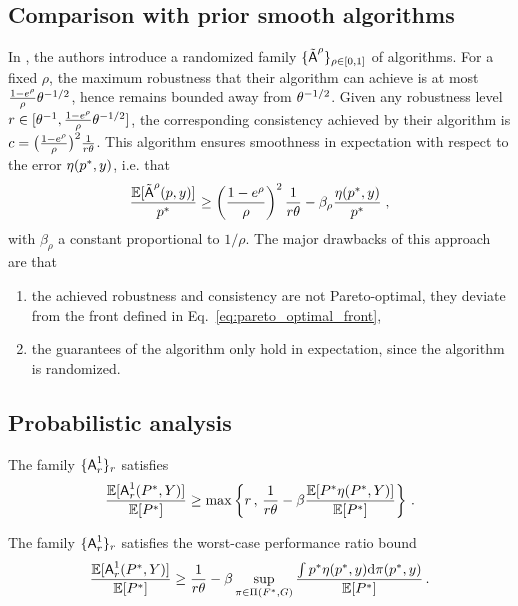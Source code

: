 \subsection{Comparison with prior smooth algorithms}\label{appx:comparison-with-prior-smooth} 
In \citep{benomar2025tradeoffs}, the authors introduce a randomized family $\{\tilde{\mbox{\textup{\textsf{A}}}}^\rho\}_{\rho \in [0,1]}$ of algorithms. For a fixed $\rho$, the maximum robustness that their algorithm can achieve is at most $\frac{1-e^\rho}{\rho} \theta^{-1/2}$, hence remains bounded away from $\theta^{-1/2}$. Given any robustness level $r \in [\theta^{-1}, \frac{1-e^\rho}{\rho} \theta^{-1/2}]$, the corresponding consistency achieved by their algorithm is  $c = \big( \frac{1-e^\rho}{\rho} \big)^2 \frac{1}{r \theta}$.
This algorithm ensures smoothness in expectation with respect to the error $\eta(p^*,y)$, i.e. that 
\[
\frac{\mathbb{E}[\tilde{\mbox{\textup{\textsf{A}}}}^\rho(p, y)]}{p^*} 
\geq \left( \frac{1-e^\rho}{\rho} \right)^2 \frac{1}{r \theta} - \beta_\rho \frac{\eta(p^*, y)}{p^*}\;,
\]
with $\beta_\rho$ a constant proportional to $1/\rho$. The major drawbacks of this approach are that
\begin{enumerate}
    \item the achieved robustness and consistency are not Pareto-optimal, \ie they deviate from the front defined in Eq.~\eqref{eq:pareto_optimal_front},
    \item the guarantees of the algorithm only hold in expectation, since the algorithm is randomized.
\end{enumerate}


\subsection{Probabilistic analysis}\label{subapp: proba additive analysis}

\begin{corollary}\label{cor: [Stochastic bounds] additive smoothness}
    The family $\{\mbox{\textup{\textsf{A}}}^1_r\}_{r}$ satisfies
    \begin{align}
        \frac{\mathbb{E}[\mbox{\textup{\textsf{A}}}^1_r(P^*,Y)]}{\mathbb{E}[P^*]}\ge \max\left\{r\,,\,\frac{1}{r\theta}-\beta\frac{\mathbb{E}[P^*\eta(P^*,Y)]}{\mathbb{E}[P^*]}\right\}\,.\label{eq: [Stochastic bounds/ THM additive smoothness] PR bound}
    \end{align}
\end{corollary}



\begin{corollary}\label{cor: [Stochastic bounds] additive smoothness OT bound}
    The family $\{\mbox{\textup{\textsf{A}}}^1_r\}_{r}$ satisfies the worst-case performance ratio bound
    \begin{align}
        \frac{\mathbb{E}[\mbox{\textup{\textsf{A}}}^1_r(P^*,Y)]}{\mathbb{E}[P^*]}\ge \frac{1}{r\theta}-\beta\sup_{\pi\in\Pi(F^*,G)}\frac{\int p^* \eta(p^*,y)\mathrm{d}\pi(p^*,y)}{\mathbb{E}[P^*]}\,.\label{eq: [Stochastic bounds/ THM additive smoothness] PR bound 2}
    \end{align}
\end{corollary}

